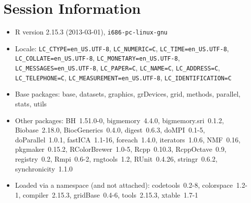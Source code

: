 \documentclass[10pt]{article}
\begin{document}
\section*{Session Information}
\begin{itemize}\raggedright
  \item R version 2.15.3 (2013-03-01), \verb|i686-pc-linux-gnu|
  \item Locale: \verb|LC_CTYPE=en_US.UTF-8|, \verb|LC_NUMERIC=C|, \verb|LC_TIME=en_US.UTF-8|, \verb|LC_COLLATE=en_US.UTF-8|, \verb|LC_MONETARY=en_US.UTF-8|, \verb|LC_MESSAGES=en_US.UTF-8|, \verb|LC_PAPER=C|, \verb|LC_NAME=C|, \verb|LC_ADDRESS=C|, \verb|LC_TELEPHONE=C|, \verb|LC_MEASUREMENT=en_US.UTF-8|, \verb|LC_IDENTIFICATION=C|
  \item Base packages: base, datasets, graphics, grDevices, grid,
    methods, parallel, stats, utils
  \item Other packages: BH~1.51.0-0, bigmemory~4.4.0,
    bigmemory.sri~0.1.2, Biobase~2.18.0, BiocGenerics~0.4.0,
    digest~0.6.3, doMPI~0.1-5, doParallel~1.0.1, fastICA~1.1-16,
    foreach~1.4.0, iterators~1.0.6, NMF~0.16, pkgmaker~0.15.2,
    RColorBrewer~1.0-5, Rcpp~0.10.3, RcppOctave~0.9, registry~0.2,
    Rmpi~0.6-2, rngtools~1.2, RUnit~0.4.26, stringr~0.6.2,
    synchronicity~1.1.0
  \item Loaded via a namespace (and not attached): codetools~0.2-8,
    colorspace~1.2-1, compiler~2.15.3, gridBase~0.4-6, tools~2.15.3,
    xtable~1.7-1
\end{itemize}
\end{document}
